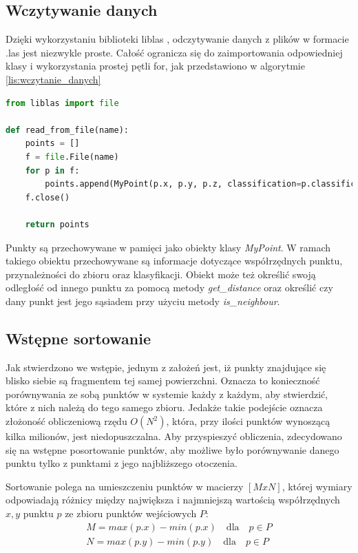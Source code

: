 \subsection{Wczytywanie danych}

Dzięki wykorzystaniu biblioteki liblas \cite{website:libLASPython}, odczytywanie danych z plików w formacie .las jest niezwykle proste.
Całość ogranicza się do zaimportowania odpowiedniej klasy i wykorzystania prostej pętli for, jak przedstawiono
w algorytmie \ref{lis:wczytanie_danych}

\begin{lstlisting}[frame=L, language=python, caption={Wczytywanie danych}, label={lis:wczytanie_danych}]
from liblas import file

def read_from_file(name):
    points = []
    f = file.File(name)
    for p in f:
        points.append(MyPoint(p.x, p.y, p.z, classification=p.classification))
    f.close()

    return points
\end{lstlisting}

Punkty są przechowywane w pamięci jako obiekty klasy \textit{MyPoint}. W ramach takiego obiektu przechowywane są informacje dotyczące
współrzędnych punktu, przynależności do zbioru oraz klasyfikacji. Obiekt może też określić swoją odległość od innego punktu
za pomocą metody \textit{get\_distance} oraz określić czy dany punkt jest jego sąsiadem przy użyciu metody \textit{is\_neighbour}.

\subsection{Wstępne sortowanie}
\label{chap:wstepne_sortowanie}

Jak stwierdzono we wstępie, jednym z założeń jest, iż punkty znajdujące się blisko siebie są fragmentem tej samej powierzchni.
Oznacza to konieczność porównywania ze sobą punktów w systemie każdy z każdym, aby stwierdzić, które z nich należą do tego samego zbioru.
Jedakże takie podejście oznacza złożoność obliczeniową rzędu $O(N^2)$, która,  przy ilości punktów wynoszącą kilka milionów, jest niedopuszczalna.
Aby przyspieszyć obliczenia, zdecydowano się na wstępne posortowanie punktów, aby możliwe było porównywanie danego punktu tylko z punktami z 
jego najbliższego otoczenia.

Sortowanie polega na umieszczeniu punktów w macierzy $[M x N]$, której wymiary odpowiadają różnicy między największa i najmniejszą wartością
współrzędnych $x, y$ punktu $p$ ze zbioru punktów wejściowych $P$:
\begin{eqnarray}
    M = max(p.x) - min(p.x) \quad \text{dla} \quad p \in P \\
    N = max(p.y) - min(p.y) \quad \text{dla} \quad p \in P
\end{eqnarray}

